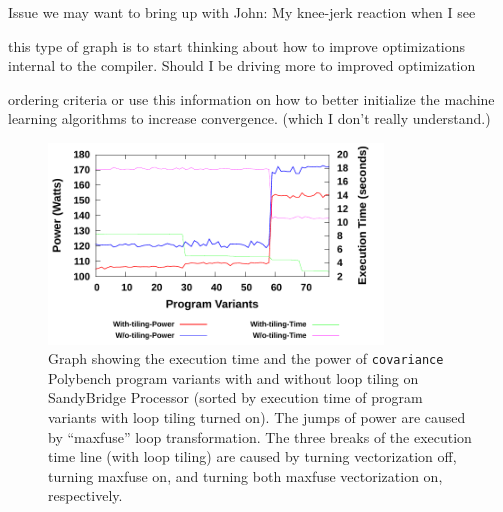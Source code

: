 Issue we may want to bring up with John: My knee-jerk reaction when I see

this type of graph is to start thinking about how to improve optimizations
internal to the compiler. Should I be driving more to improved optimization

ordering criteria or use this information  on how to better initialize
the machine learning algorithms to increase convergence. (which I don't
really understand.)

\begin{figure}[bt]
    \includegraphics[width=3.5in]{Covariance}
    \caption{Graph showing the execution time and the power of \texttt{covariance} Polybench program variants with 
and without loop tiling on SandyBridge Processor (sorted by execution time of program variants with loop tiling turned on).
 The jumps of power are caused by ``maxfuse'' loop transformation. The three breaks of the execution time line (with loop tiling)
are caused by turning vectorization off, turning maxfuse on, and turning both maxfuse vectorization on, respectively.}
    \label{fig:TE}
\end{figure}
